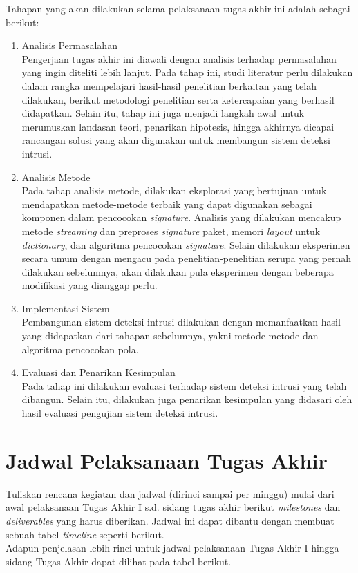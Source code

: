   Tahapan yang akan dilakukan selama pelaksanaan tugas akhir ini adalah sebagai berikut:
  \begin{enumerate}

      \item Analisis Permasalahan \\
      Pengerjaan tugas akhir ini diawali dengan analisis terhadap permasalahan yang ingin diteliti lebih lanjut. Pada tahap ini, studi literatur perlu dilakukan dalam rangka mempelajari hasil-hasil penelitian berkaitan yang telah dilakukan, berikut metodologi penelitian serta ketercapaian yang berhasil didapatkan. Selain itu, tahap ini juga menjadi langkah awal untuk merumuskan landasan teori, penarikan hipotesis, hingga akhirnya dicapai rancangan solusi yang akan digunakan untuk membangun sistem deteksi intrusi.

      \item Analisis Metode \\
      Pada tahap analisis metode, dilakukan eksplorasi yang bertujuan untuk mendapatkan metode-metode terbaik yang dapat digunakan sebagai komponen dalam pencocokan \emph{signature}. Analisis yang dilakukan mencakup metode \emph{streaming} dan preproses \emph{signature} paket, memori \emph{layout} untuk \emph{dictionary}, dan algoritma pencocokan \emph{signature}. Selain dilakukan eksperimen secara umum dengan mengacu pada penelitian-penelitian serupa yang pernah dilakukan sebelumnya, akan dilakukan pula eksperimen dengan beberapa modifikasi yang dianggap perlu.

      \item Implementasi Sistem \\
      Pembangunan sistem deteksi intrusi dilakukan dengan memanfaatkan hasil yang didapatkan dari tahapan sebelumnya, yakni metode-metode dan algoritma pencocokan pola. 

      \item Evaluasi dan Penarikan Kesimpulan \\
      Pada tahap ini dilakukan evaluasi terhadap sistem deteksi intrusi yang telah dibangun. Selain itu, dilakukan juga penarikan kesimpulan yang didasari oleh hasil evaluasi pengujian sistem deteksi intrusi.

  \end{enumerate}

\section{Jadwal Pelaksanaan Tugas Akhir}

  Tuliskan rencana kegiatan dan jadwal (dirinci sampai per minggu) mulai dari awal pelaksanaan Tugas Akhir I s.d. sidang tugas akhir berikut \emph{milestones} dan \emph{deliverables} yang harus diberikan. Jadwal ini dapat dibantu dengan membuat sebuah tabel \emph{timeline} seperti berikut. \\
  

  Adapun penjelasan lebih rinci untuk jadwal pelaksanaan Tugas Akhir I hingga sidang Tugas Akhir dapat dilihat pada tabel berikut. \\
  
